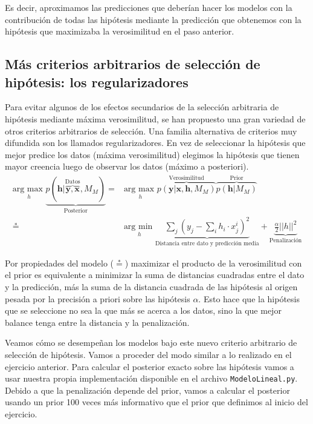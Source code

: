 \documentclass[a4paper,10pt]{article}
\begin{document}
Es decir, aproximamos las predicciones que deberían hacer los modelos con la contribución de todas las hipótesis mediante la predicción que obtenemos con la hipótesis que maximizaba la verosimilitud en el paso anterior.

\subsection{Más criterios arbitrarios de selección de hipótesis: los regularizadores}

Para evitar algunos de los efectos secundarios de la selección arbitraria de hipótesis mediante máxima verosimilitud, se han propuesto una gran variedad de otros criterios arbitrarios de selección.
Una familia alternativa de criterios muy difundida son los llamados regularizadores.
En vez de seleccionar la hipótesis que mejor predice los datos (máxima verosimilitud) elegimos la hipótesis que tienen mayor creencia luego de observar los datos (máximo a posteriori).
\begin{align*}
\underset{h}{\text{arg max \ }} \underbrace{p(\bm{h}| \overbrace{\bm{y}, \bm{x}}^{\text{Datos}}, M_M )}_{\text{Posterior}} = &
\underset{h}{\text{arg max \ }} \overbrace{p( \bm{y}| \bm{x}, \bm{h}, M_M )}^{\text{Verosimilitud}} \overbrace{p(\bm{h}|M_M )}^{\text{Prior}} \\
\overset{*}{=}& \underset{h}{\text{arg min \ }} \underbrace{\sum_{j} (y_j - \sum_i h_i \cdot x_j^i) ^2}_{\text{Distancia entre dato y predicción media}} + \underbrace{ \frac{\alpha}{2}||h||^2}_{\text{Penalización}}
\end{align*}

Por propiedades del modelo ($\overset{*}{=}$) maximizar el producto de la verosimilitud con el prior es equivalente a minimizar la suma de distancias cuadradas entre el dato y la predicción, más la suma de la distancia cuadrada de las hipótesis al origen pesada por la precisión a priori sobre las hipótesis $\alpha$.
Esto hace que la hipótesis que se seleccione no sea la que más se acerca a los datos, sino la que mejor balance tenga entre la distancia y la penalización.

Veamos cómo se desempeñan los modelos bajo este nuevo criterio arbitrario de selección de hipótesis.
Vamos a proceder del modo similar a lo realizado en el ejercicio anterior.
Para calcular el posterior exacto sobre las hipótesis vamos a usar nuestra propia implementación disponible en el archivo \texttt{ModeloLineal.py}.
Debido a que la penalización depende del prior, vamos a calcular el posterior usando un prior 100 veces más informativo que el prior que definimos al inicio del ejercicio.
\end{document}
